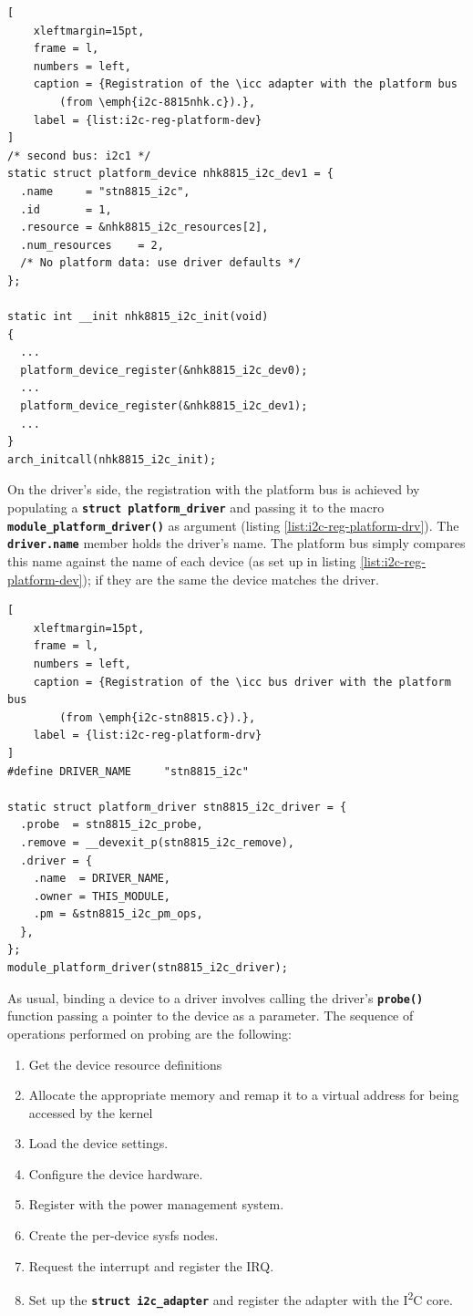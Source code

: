 \documentclass[a4paper,10pt]{article}
\newenvironment{packedenum}{
\begin{enumerate}
  \setlength{\itemsep}{3pt}
  \setlength{\parskip}{0pt}
  \setlength{\parsep}{0pt}
}{\end{enumerate}}
\newcommand{\icc}{I\textsuperscript{2}C }
\newcommand{\keyword}[1]{\texttt{\textbf{#1}}}
\begin{document}
\begin{multicols}{2}
\begin{lstlisting}[
	xleftmargin=15pt,
	frame = l,
	numbers = left,
	caption = {Registration of the \icc adapter with the platform bus
		(from \emph{i2c-8815nhk.c}).},
	label = {list:i2c-reg-platform-dev}
]
/* second bus: i2c1 */
static struct platform_device nhk8815_i2c_dev1 = {
  .name		= "stn8815_i2c",
  .id		= 1,
  .resource	= &nhk8815_i2c_resources[2],
  .num_resources	= 2,
  /* No platform data: use driver defaults */
};

static int __init nhk8815_i2c_init(void)
{
  ...
  platform_device_register(&nhk8815_i2c_dev0);
  ...
  platform_device_register(&nhk8815_i2c_dev1);
  ...
}
arch_initcall(nhk8815_i2c_init);
\end{lstlisting}

On the driver's side, the registration with the platform bus is achieved by
populating a \keyword{struct  platform\_driver} and passing it to the
macro \keyword{module\_platform\_driver()} as argument (listing
\ref{list:i2c-reg-platform-drv}).
The \keyword{driver.name} member holds the driver's name.
The platform bus simply compares this name against the name of each device
(as set up in listing \ref{list:i2c-reg-platform-dev}); if they are the same
the device matches the driver.

\begin{lstlisting}[
	xleftmargin=15pt,
	frame = l,
	numbers = left,
	caption = {Registration of the \icc bus driver with the platform bus
		(from \emph{i2c-stn8815.c}).},
	label = {list:i2c-reg-platform-drv}
]
#define DRIVER_NAME 	"stn8815_i2c"

static struct platform_driver stn8815_i2c_driver = {
  .probe  = stn8815_i2c_probe,
  .remove = __devexit_p(stn8815_i2c_remove),
  .driver = {
    .name  = DRIVER_NAME,
    .owner = THIS_MODULE,
    .pm	= &stn8815_i2c_pm_ops,
  },
};
module_platform_driver(stn8815_i2c_driver);
\end{lstlisting}

As usual, binding a device to a driver involves calling the driver's 
\keyword{probe()} function passing a pointer to the device as a parameter.
The sequence of operations performed on probing are the following:
\begin{packedenum}
	\item Get the device resource definitions
	\item Allocate the appropriate memory and remap it to a virtual address
		for being accessed by the kernel
	\item Load the device settings.
	\item Configure the device hardware.
	\item Register with the power management system.
	\item Create the per-device sysfs nodes.
	\item Request the interrupt and	register the IRQ.
	\item Set up the \keyword{struct i2c\_adapter} and register the adapter
		with the \icc core.
\end{packedenum}


\end{multicols}
\end{document}
